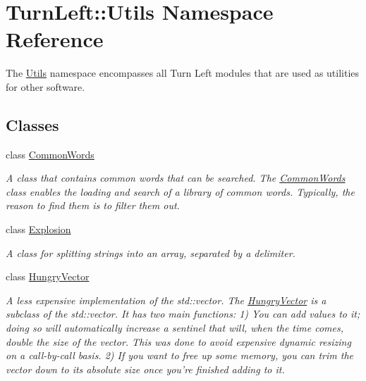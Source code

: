 \hypertarget{namespaceTurnLeft_1_1Utils}{
\section{TurnLeft::Utils Namespace Reference}
\label{namespaceTurnLeft_1_1Utils}
}


The \hyperlink{namespaceTurnLeft_1_1Utils}{Utils} namespace encompasses all Turn Left modules that are used as utilities for other software.  


\subsection*{Classes}
\begin{DoxyCompactItemize}
\item 
class \hyperlink{classTurnLeft_1_1Utils_1_1CommonWords}{CommonWords}
\begin{DoxyCompactList}\small\item\em A class that contains common words that can be searched. The \hyperlink{classTurnLeft_1_1Utils_1_1CommonWords}{CommonWords} class enables the loading and search of a library of common words. Typically, the reason to find them is to filter them out. \item\end{DoxyCompactList}\item 
class \hyperlink{classTurnLeft_1_1Utils_1_1Explosion}{Explosion}
\begin{DoxyCompactList}\small\item\em A class for splitting strings into an array, separated by a delimiter. \item\end{DoxyCompactList}\item 
class \hyperlink{classTurnLeft_1_1Utils_1_1HungryVector}{HungryVector}
\begin{DoxyCompactList}\small\item\em A less expensive implementation of the std::vector. The \hyperlink{classTurnLeft_1_1Utils_1_1HungryVector}{HungryVector} is a subclass of the std::vector. It has two main functions: 1) You can add values to it; doing so will automatically increase a sentinel that will, when the time comes, double the size of the vector. This was done to avoid expensive dynamic resizing on a call-\/by-\/call basis. 2) If you want to free up some memory, you can trim the vector down to its absolute size once you're finished adding to it. \item\end{DoxyCompactList}\item 

\end{DoxyCompactItemize}
